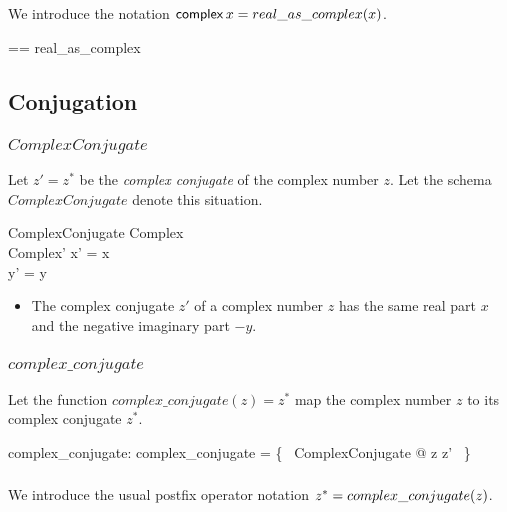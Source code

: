\documentclass{amsart}
\begin{document}
\subsubsection{}

We introduce the notation $\operatorname{\mathsf{complex}} x = real\_as\_complex(x)$.

\begin{zed}
	\asRC == real\_as\_complex
\end{zed}

\subsection{Conjugation}

\subsubsection{$ComplexConjugate$}

Let $z' = z^*$ be the \textit{complex conjugate} of the complex number $z$.
Let the schema $ComplexConjugate$ denote this situation.

\begin{schema}{ComplexConjugate}
	Complex \\
	Complex'
\where
	x' = x \\
	y' = \negR y
\end{schema}
\begin{itemize}
\item The complex conjugate $z'$ of a complex number $z$ has the same real part $x$ 
and the negative imaginary part $-y$.
\end{itemize}

\subsubsection{$complex\_conjugate$}

Let the function $complex\_conjugate(z) = z^*$ map the complex number $z$ to its complex conjugate $z^*$.

\begin{axdef}
	complex\_conjugate: \C \fun \C
\where
	complex\_conjugate = \{~ ComplexConjugate @ z \mapsto z' ~\}
\end{axdef}

\subsubsection{}

We introduce the usual postfix operator notation $z^* = complex\_conjugate(z)$.
\end{document}
